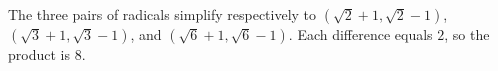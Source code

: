 The three pairs of radicals simplify respectively to $(\sqrt2+1,\sqrt2-1)$, $(\sqrt3+1,\sqrt3-1)$, and $(\sqrt6+1,\sqrt6-1)$. Each difference equals $2$, so the product is $\boxed8$.
